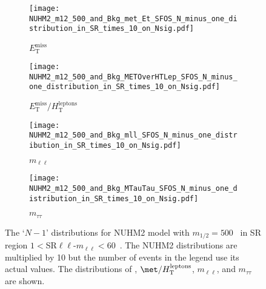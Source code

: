 \begin{figure}[htbp]
    \begin{center}
        \begin{subfigure}[b]{0.48\textwidth}
            \texttt{[image: NUHM2\_m12\_500\_and\_Bkg\_met\_Et\_SFOS\_N\_minus\_one\_distribution\_in\_SR\_times\_10\_on\_Nsig.pdf]}
            \caption{$E^{\mathrm{miss}}_{\mathrm{T}}$}
            \label{fig:event_nuhm2_m12_500_met_SFOS}
        \end{subfigure}
        \begin{subfigure}[b]{0.48\textwidth}
            \texttt{[image: NUHM2\_m12\_500\_and\_Bkg\_METOverHTLep\_SFOS\_N\_minus\_one\_distribution\_in\_SR\_times\_10\_on\_Nsig.pdf]}
            \caption{$E^{\mathrm{miss}}_{\mathrm{T}} / H^{\mathrm{leptons}}_{\mathrm{T}}$}
            \label{fig:event_nuhm2_m12_500_METOverHTLep_SFOS}
        \end{subfigure}
        \begin{subfigure}[b]{0.48\textwidth}
            \texttt{[image: NUHM2\_m12\_500\_and\_Bkg\_mll\_SFOS\_N\_minus\_one\_distribution\_in\_SR\_times\_10\_on\_Nsig.pdf]}
            \caption{$m_{\ell\ell}$}
            \label{fig:event_nuhm2_m12_500_mll_SFOS}
        \end{subfigure}
        \begin{subfigure}[b]{0.48\textwidth}
            \texttt{[image: NUHM2\_m12\_500\_and\_Bkg\_MTauTau\_SFOS\_N\_minus\_one\_distribution\_in\_SR\_times\_10\_on\_Nsig.pdf]}
            \caption{$m_{\tau\tau}$}
            \label{fig:event_nuhm2_m12_500_MTauTau_SFOS}
        \end{subfigure}
    \end{center}
    \caption{The `$N-1$' distributions for NUHM2 model with $m_{1/2} = 500$~{\GeV} in SR region $1 < $SR$\ell \ell$-$m_{\ell \ell} < 60$~{\GeV}.
    The NUHM2 distributions are multiplied by 10 but the number of events in the legend use its actual values.
    The distributions of \met, $\met/H_\mathrm{T}^\mathrm{leptons}$, $m_{\ell \ell}$, and $m_{\tau \tau}$ are shown.}
    \label{fig:event_nuhm2_kinematic_in_SR_SFOS_2}
\end{figure}

